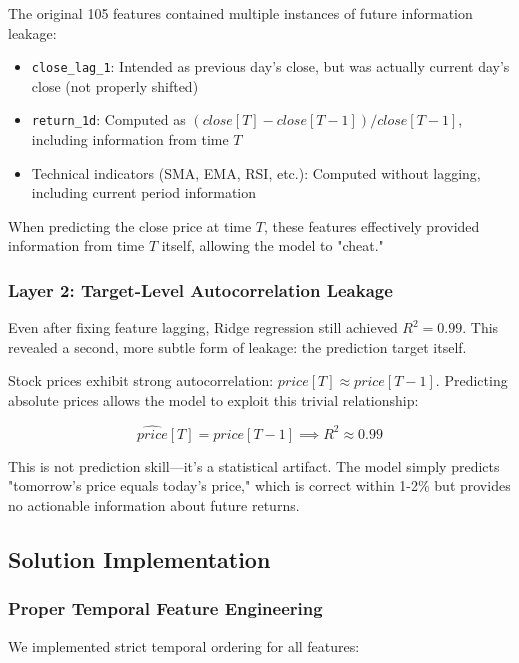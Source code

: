 \documentclass[conference]{IEEEtran}
\begin{document}
The original 105 features contained multiple instances of future information leakage:

\begin{itemize}
    \item \texttt{close\_lag\_1}: Intended as previous day's close, but was actually current day's close (not properly shifted)
    \item \texttt{return\_1d}: Computed as $(close[T] - close[T-1]) / close[T-1]$, including information from time $T$
    \item Technical indicators (SMA, EMA, RSI, etc.): Computed without lagging, including current period information
\end{itemize}

When predicting the close price at time $T$, these features effectively provided information from time $T$ itself, allowing the model to "cheat."

\subsubsection{Layer 2: Target-Level Autocorrelation Leakage}

Even after fixing feature lagging, Ridge regression still achieved $R^2 = 0.99$. This revealed a second, more subtle form of leakage: the prediction target itself.

Stock prices exhibit strong autocorrelation: $price[T] \approx price[T-1]$. Predicting absolute prices allows the model to exploit this trivial relationship:

\begin{equation}
\hat{price}[T] = price[T-1] \implies R^2 \approx 0.99
\end{equation}

This is not prediction skill—it's a statistical artifact. The model simply predicts "tomorrow's price equals today's price," which is correct within 1-2\% but provides no actionable information about future returns.

\subsection{Solution Implementation}

\subsubsection{Proper Temporal Feature Engineering}

We implemented strict temporal ordering for all features:
\end{document}
